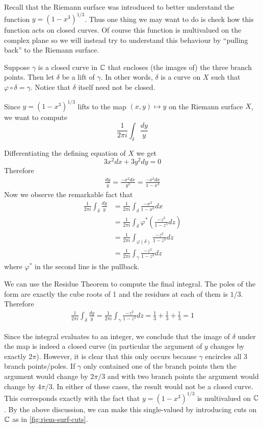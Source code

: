 Recall that the Riemann surface was introduced to better understand the function $y = (1 - x^3)^{1/3}$. Thus one thing we may want to do is check how this function acts on closed curves. Of course this function is multivalued on the complex plane so we will instead try to understand this behaviour by ``pulling back'' to the Riemann surface.

Suppose $\gamma$ is a closed curve in $\mathbb{C}$ that encloses (the images of) the three branch points. Then let $\delta$ be a lift of $\gamma$. In other words, $\delta$ is a curve on $X$ such that $\varphi \circ \delta = \gamma$. Notice that $\delta$ itself need not be closed. 

Since $y = (1 - x^3)^{1/3}$ lifts to the map $(x, y) \mapsto y$ on the Riemann surface $X$, we want to compute 
$$\frac{1}{2\pi i} \int_\delta \frac{dy}{y}$$

Differentiating the defining equation of $X$ we get 
$$3x^2 dx + 3y^2 dy = 0$$
Therefore 
\begin{align*}
    \frac{dy}{y} = \frac{-x^2 dx}{y^3} = \frac{-x^2 dx}{1 - x^3}
\end{align*}
Now we observe the remarkable fact that 
\begin{align*}
    \frac{1}{2\pi i} \int_\delta \frac{dy}{y} &= \frac{1}{2\pi i} \int_\delta \frac{-x^2 }{1 - x^3} dx\\
    &= \frac{1}{2\pi i} \int_\delta \varphi^* \left( \frac{-z^2}{1 - z^3} dz \right)\\
    &= \frac{1}{2\pi i} \int_{\varphi(\delta)} \frac{-z^2}{1 - z^3} dz\\
    &= \frac{1}{2\pi i} \int_\gamma \frac{-z^2}{1 - z^3} dz
\end{align*}
where $\varphi^*$ in the second line is the pullback.

We can use the Residue Theorem to compute the final integral. The poles of the form are exactly the cube roots of 1 and the residues at each of them is $1/3$. Therefore 
\begin{align*}
    \frac{1}{2\pi i} \int_\delta \frac{dy}{y} = \frac{1}{2\pi i} \int_\gamma \frac{-z^2}{1 - z^3} dz = \frac{1}{3} + \frac{1}{3} + \frac{1}{3} = 1
\end{align*}

Since the integral evaluates to an integer, we conclude that the image of $\delta$ under the map is indeed a closed curve (in particular the argument of $y$ changes by exactly $2\pi$). However, it is clear that this only occurs because $\gamma$ encircles all 3 branch points/poles. If $\gamma$ only contained one of the branch points then the argument would change by $2\pi/3$ and with two branch points the argument would change by $4 \pi/3$. In either of these cases, the result would not be a closed curve. This corresponds exactly with the fact that $y = (1 - x^3)^{1/3}$ is multivalued on $\mathbb{C}$. By the above discussion, we can make this single-valued by introducing cuts on $\mathbb{C}$ as in \autoref{fig:riem-surf-cuts}.

